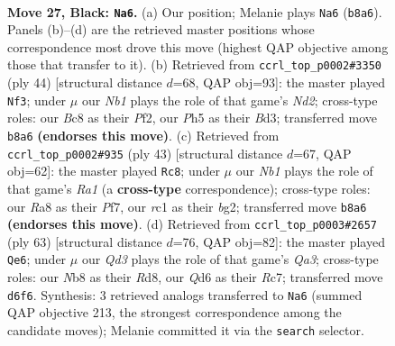\documentclass[11pt]{article}
\begin{document}
\clearpage

\begin{figure}[p]\centering
\begin{subfigure}{0.46\textwidth}\centering
\resizebox{\linewidth}{!}{%
\newchessgame
\chessboard[
  setfen={rnb5/pp4k1/2pq2p1/6pp/3P4/PB3PP1/1P2R2P/2RQ2K1 b - - 1 27},
  showmover=false,
  pgfstyle=straightmove, color=movearrow, markmove={b8-a6}
]}
\caption{}
\end{subfigure}\hfill
\begin{subfigure}{0.46\textwidth}\centering
\resizebox{\linewidth}{!}{%
\newchessgame
\chessboard[
  setfen={2r3k1/pbq1npp1/1p1pp2p/8/1Q1PP3/P2B3P/1P1N1PP1/R5K1 w - - 0 23},
  showmover=false,
  pgfstyle=straightmove, color=movearrow, markmove={d2-f3}
]}
\caption{}
\end{subfigure}
\\[4pt]
\begin{subfigure}{0.46\textwidth}\centering
\resizebox{\linewidth}{!}{%
\newchessgame
\chessboard[
  setfen={r2q2k1/1p3pp1/1p5p/pP3b2/P2P3P/4P1P1/6B1/R2Q2K1 b - - 0 22},
  showmover=false,
  pgfstyle=straightmove, color=movearrow, markmove={a8-c8}
]}
\caption{}
\end{subfigure}\hfill
\begin{subfigure}{0.46\textwidth}\centering
\resizebox{\linewidth}{!}{%
\newchessgame
\chessboard[
  setfen={3r4/p1r1nk1p/q4ppP/2P5/P2pB3/1p4P1/1P3P1K/2RRQ3 b - - 1 32},
  showmover=false,
  pgfstyle=straightmove, color=movearrow, markmove={a6-e6}
]}
\caption{}
\end{subfigure}
\caption{\textbf{Move 27, Black: \texttt{Na6}.} (a) Our position; Melanie plays \texttt{Na6} (\texttt{b8a6}). Panels (b)--(d) are the retrieved master positions whose correspondence most drove this move (highest QAP objective among those that transfer to it). (b) Retrieved from \texttt{ccrl\_top\_p0002\#3350} (ply 44) [structural distance $d$=68, QAP obj=93]: the master played \texttt{Nf3}; under $\mu$ our \emph{Nb1} plays the role of that game's \emph{Nd2}; cross-type roles: our \emph{B}c8 as their \emph{P}f2, our \emph{P}h5 as their \emph{B}d3; transferred move \texttt{b8a6} \textbf{(endorses this move)}. (c) Retrieved from \texttt{ccrl\_top\_p0002\#935} (ply 43) [structural distance $d$=67, QAP obj=62]: the master played \texttt{Rc8}; under $\mu$ our \emph{Nb1} plays the role of that game's \emph{Ra1} (a \textbf{cross-type} correspondence); cross-type roles: our \emph{R}a8 as their \emph{P}f7, our \emph{r}c1 as their \emph{b}g2; transferred move \texttt{b8a6} \textbf{(endorses this move)}. (d) Retrieved from \texttt{ccrl\_top\_p0003\#2657} (ply 63) [structural distance $d$=76, QAP obj=82]: the master played \texttt{Qe6}; under $\mu$ our \emph{Qd3} plays the role of that game's \emph{Qa3}; cross-type roles: our \emph{N}b8 as their \emph{R}d8, our \emph{Q}d6 as their \emph{R}c7; transferred move \texttt{d6f6}. Synthesis: 3 retrieved analogs transferred to \texttt{Na6} (summed QAP objective 213, the strongest correspondence among the candidate moves); Melanie committed it via the \texttt{search} selector.}
\label{fig:thought-m53}
\end{figure}
\end{document}
